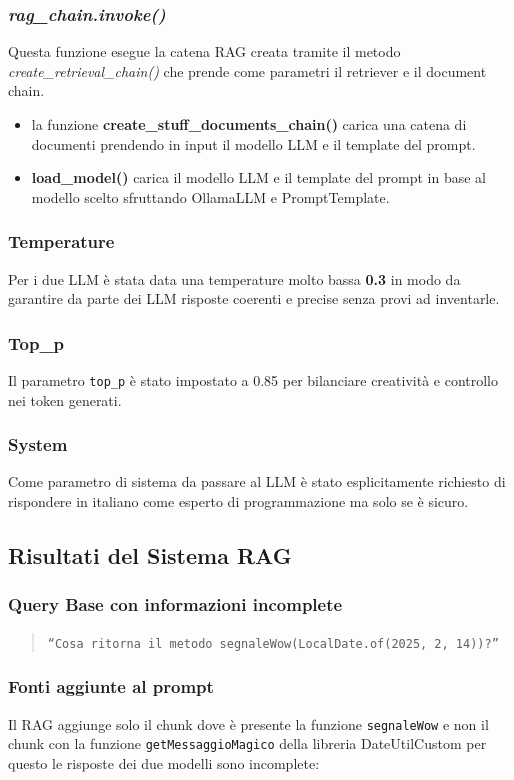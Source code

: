 \documentclass[12pt,a4paper,openright,twoside]{book}
\begin{document}
\subsubsection{\emph{rag\_chain.invoke()}}
 Questa funzione esegue la catena RAG creata tramite il metodo \emph{create\_retrieval\_chain()} che prende come parametri il retriever e il document chain.
 \begin{itemize}
    \item la funzione \textbf{create\_stuff\_documents\_chain()} carica una catena di documenti prendendo in input il modello LLM e il template del prompt.
    \item \textbf{load\_model()} carica il modello LLM e il template del prompt in base al modello scelto sfruttando OllamaLLM e PromptTemplate.
 \end{itemize}
 \subsubsection{Temperature}
Per i due LLM è stata data una temperature molto bassa \textbf{0.3} in modo da garantire da parte dei LLM risposte coerenti e precise senza provi ad inventarle.
\subsubsection{Top\_p}
Il parametro \texttt{top\_p} è stato impostato a 0.85 per bilanciare creatività e controllo nei token generati.
\subsubsection{System}
Come parametro di sistema da passare al LLM è stato esplicitamente richiesto di rispondere in italiano come esperto di programmazione ma solo se è sicuro.

\subsection{Risultati del Sistema RAG}
\subsubsection{Query Base con informazioni incomplete}
\begin{quote}
    \texttt{``Cosa ritorna il metodo segnaleWow(LocalDate.of(2025, 2, 14))?''}
\end{quote}
\subsubsection{Fonti aggiunte al prompt}
Il RAG aggiunge solo il chunk dove è presente la funzione \texttt{segnaleWow} e non il chunk con la funzione \texttt{getMessaggioMagico} della libreria DateUtilCustom
per questo le risposte dei due modelli sono incomplete:
\end{document}
